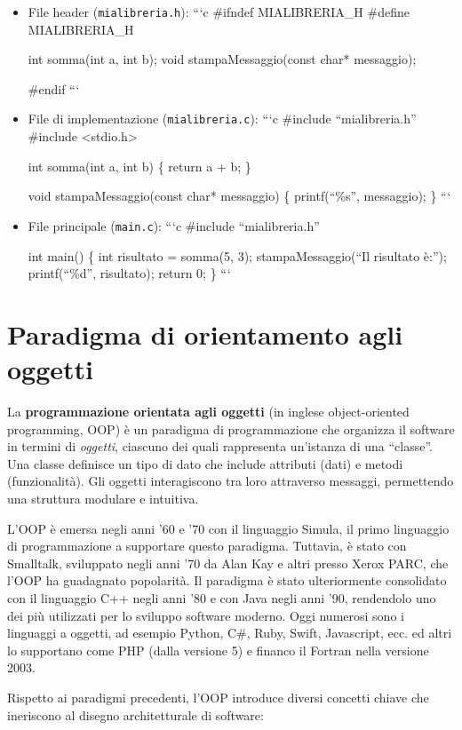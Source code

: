 \documentclass[
  letterpaper,
  DIV=11,
  numbers=noendperiod]{scrreprt}
\begin{document}
\begin{itemize}
\item
  File header (\texttt{mialibreria.h}): ```c \#ifndef MIALIBRERIA\_H
  \#define MIALIBRERIA\_H

  int somma(int a, int b); void stampaMessaggio(const char* messaggio);

  \#endif ```
\item
  File di implementazione (\texttt{mialibreria.c}): ```c \#include
  ``mialibreria.h'' \#include \textless stdio.h\textgreater{}

  int somma(int a, int b) \{ return a + b; \}

  void stampaMessaggio(const char* messaggio) \{ printf(``\%s\n'',
  messaggio); \} ```
\item
  File principale (\texttt{main.c}): ```c \#include ``mialibreria.h''

  int main() \{ int risultato = somma(5, 3); stampaMessaggio(``Il
  risultato è:''); printf(``\%d\n'', risultato); return 0; \} ```
\end{itemize}

\section{Paradigma di orientamento agli
oggetti}\label{paradigma-di-orientamento-agli-oggetti}

La \textbf{programmazione orientata agli oggetti} (in inglese
object-oriented programming, OOP) è un paradigma di programmazione che
organizza il software in termini di \emph{oggetti}, ciascuno dei quali
rappresenta un'istanza di una ``classe''. Una classe definisce un tipo
di dato che include attributi (dati) e metodi (funzionalità). Gli
oggetti interagiscono tra loro attraverso messaggi, permettendo una
struttura modulare e intuitiva.

L'OOP è emersa negli anni '60 e '70 con il linguaggio Simula, il primo
linguaggio di programmazione a supportare questo paradigma. Tuttavia, è
stato con Smalltalk, sviluppato negli anni '70 da Alan Kay e altri
presso Xerox PARC, che l'OOP ha guadagnato popolarità. Il paradigma è
stato ulteriormente consolidato con il linguaggio C++ negli anni '80 e
con Java negli anni '90, rendendolo uno dei più utilizzati per lo
sviluppo software moderno. Oggi numerosi sono i linguaggi a oggetti, ad
esempio Python, C\#, Ruby, Swift, Javascript, ecc. ed altri lo
supportano come PHP (dalla versione 5) e financo il Fortran nella
versione 2003.

Rispetto ai paradigmi precedenti, l'OOP introduce diversi concetti
chiave che ineriscono al disegno architetturale di software:
\end{document}
